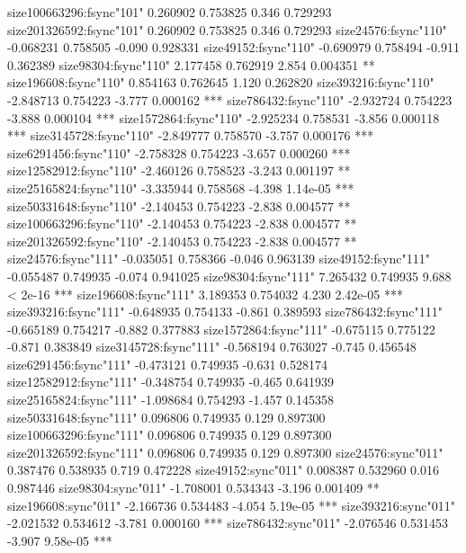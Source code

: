 \documentclass[11pt]{article}
\begin{document}
\begin{Schunk}
\begin{Soutput}
size100663296:fsync"101"        0.260902   0.753825   0.346 0.729293    
size201326592:fsync"101"        0.260902   0.753825   0.346 0.729293    
size24576:fsync"110"           -0.068231   0.758505  -0.090 0.928331    
size49152:fsync"110"           -0.690979   0.758494  -0.911 0.362389    
size98304:fsync"110"            2.177458   0.762919   2.854 0.004351 ** 
size196608:fsync"110"           0.854163   0.762645   1.120 0.262820    
size393216:fsync"110"          -2.848713   0.754223  -3.777 0.000162 ***
size786432:fsync"110"          -2.932724   0.754223  -3.888 0.000104 ***
size1572864:fsync"110"         -2.925234   0.758531  -3.856 0.000118 ***
size3145728:fsync"110"         -2.849777   0.758570  -3.757 0.000176 ***
size6291456:fsync"110"         -2.758328   0.754223  -3.657 0.000260 ***
size12582912:fsync"110"        -2.460126   0.758523  -3.243 0.001197 ** 
size25165824:fsync"110"        -3.335944   0.758568  -4.398 1.14e-05 ***
size50331648:fsync"110"        -2.140453   0.754223  -2.838 0.004577 ** 
size100663296:fsync"110"       -2.140453   0.754223  -2.838 0.004577 ** 
size201326592:fsync"110"       -2.140453   0.754223  -2.838 0.004577 ** 
size24576:fsync"111"           -0.035051   0.758366  -0.046 0.963139    
size49152:fsync"111"           -0.055487   0.749935  -0.074 0.941025    
size98304:fsync"111"            7.265432   0.749935   9.688  < 2e-16 ***
size196608:fsync"111"           3.189353   0.754032   4.230 2.42e-05 ***
size393216:fsync"111"          -0.648935   0.754133  -0.861 0.389593    
size786432:fsync"111"          -0.665189   0.754217  -0.882 0.377883    
size1572864:fsync"111"         -0.675115   0.775122  -0.871 0.383849    
size3145728:fsync"111"         -0.568194   0.763027  -0.745 0.456548    
size6291456:fsync"111"         -0.473121   0.749935  -0.631 0.528174    
size12582912:fsync"111"        -0.348754   0.749935  -0.465 0.641939    
size25165824:fsync"111"        -1.098684   0.754293  -1.457 0.145358    
size50331648:fsync"111"         0.096806   0.749935   0.129 0.897300    
size100663296:fsync"111"        0.096806   0.749935   0.129 0.897300    
size201326592:fsync"111"        0.096806   0.749935   0.129 0.897300    
size24576:sync"011"             0.387476   0.538935   0.719 0.472228    
size49152:sync"011"             0.008387   0.532960   0.016 0.987446    
size98304:sync"011"            -1.708001   0.534343  -3.196 0.001409 ** 
size196608:sync"011"           -2.166736   0.534483  -4.054 5.19e-05 ***
size393216:sync"011"           -2.021532   0.534612  -3.781 0.000160 ***
size786432:sync"011"           -2.076546   0.531453  -3.907 9.58e-05 ***

\end{Soutput}
\end{Schunk}
\end{document}
